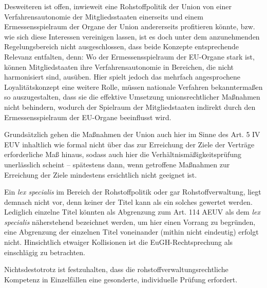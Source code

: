 \documentclass[12pt,a4paper,oneside]{book} %
\begin{document}
	Desweiteren ist offen, inwieweit eine Rohstoffpolitik der Union von einer Verfahrensautonomie der Mitgliedsstaaten einerseits und einem Ermessensspielraum der Organe der Union andererseits profitieren könnte, bzw. wie sich diese Interessen vereinigen lassen, ist es doch unter dem anzunehmenden Regelungsbereich nicht ausgeschlossen, dass beide Konzepte entsprechende Relevanz entfalten, denn: Wo der Ermessensspielraum der EU-Organe stark ist, können Mitgliedstaaten ihre Verfahrensautonomie in Bereichen, die nicht harmonisiert sind, ausüben. Hier spielt jedoch das mehrfach angesprochene Loyalitätskonzept eine weitere Rolle, müssen nationale Verfahren bekanntermaßen so auszugestalten, dass sie die effektive Umsetzung unionsrechtlicher Maßnahmen nicht behindern, wodurch der Spielraum der Mitgliedstaaten indirekt durch den Ermessensspielraum der EU-Organe beeinflusst wird.
	
	Grundsätzlich gehen die Maßnahmen der Union auch hier im Sinne des Art. 5 IV EUV \glqq inhaltlich wie formal nicht über das zur Erreichung der Ziele der Verträge erforderliche Maß hinaus\grqq, sodass auch hier die Verhältnismäßigkeitsprüfung unerlässlich scheint -- spätestens dann, wenn getroffene Maßnahmen zur Erreichung der Ziele mindestens ersichtlich nicht geeignet ist.\autocite{Gundel in Dause/Ludwigs, M., Rn 45 iVm u. mwN v. Danwitz EWS 2003 393ff.}
	
	Ein \textit{lex specialis} im Bereich der Rohstoffpolitik oder gar Rohstoffverwaltung, liegt demnach nicht vor, denn keiner der Titel kann als ein solches gewertet werden. Lediglich einzelne Titel könnten als Abgrenzung zum Art. 114 AEUV als dem \textit{lex specialis} näherstehend bezeichnet werden, um hier einen Vorrang zu begründen,\autocite{Calliies, Berliner Beiträge 52, S. 18ff., mwN Hamer in von der Groeben/schwarze/Hatje 2015, Art. 194, Rn. 26} eine Abgrenzung der einzelnen Titel voneinander (mithin nicht eindeutig)\autocite{Gundel EWS 2011, 25, 29; Kahl EuR 2009, 601, 608} erfolgt nicht.  Hinsichtlich etwaiger Kollisionen ist die EuGH-Rechtsprechung als einschlägig zu betrachten.
	
	Nichtsdestotrotz ist festzuhalten, dass die rohstoffverwaltungsrechtliche Kompetenz in Einzelfällen eine gesonderte, individuelle Prüfung erfordert.
	
\end{document}
